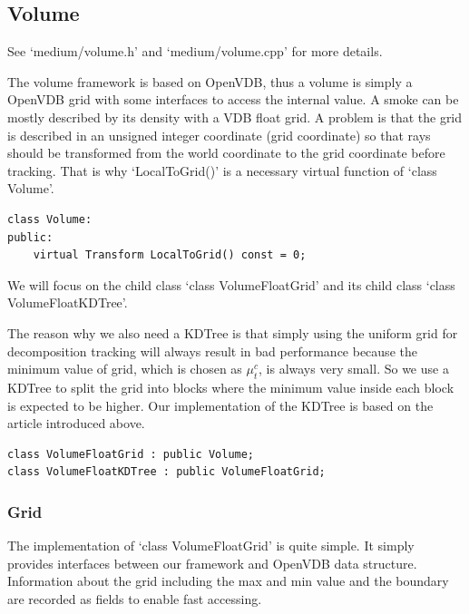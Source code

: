 \documentclass[acmtog]{acmart}
\begin{document}
\subsection{Volume}
    See `medium/volume.h' and `medium/volume.cpp' for more details.\par
        The volume framework is based on OpenVDB, 
    thus a volume is simply a OpenVDB grid with some interfaces to access the internal value.
    A smoke can be mostly described by its density with a VDB float grid.
    A problem is that the grid is described in an unsigned integer coordinate (grid coordinate) so that
    rays should be transformed from the world coordinate to the grid coordinate before tracking.
    That is why `LocalToGrid()' is a necessary virtual function of `class Volume'.
\begin{lstlisting}
class Volume:
public:
    virtual Transform LocalToGrid() const = 0;
\end{lstlisting}
    We will focus on the child class `class VolumeFloatGrid' and its child class `class VolumeFloatKDTree'.\par
        The reason why we also need a KDTree is that 
    simply using the uniform grid for decomposition tracking will always result in bad performance 
    because the minimum value of grid, which is chosen as $\mu_t^c$, is always very small.
    So we use a KDTree to split the grid into blocks where the minimum value inside each block is expected to be higher.
    Our implementation of the KDTree is based on the article introduced above.
\begin{lstlisting}
class VolumeFloatGrid : public Volume;
class VolumeFloatKDTree : public VolumeFloatGrid;
\end{lstlisting}

\subsubsection{Grid}
        The implementation of `class VolumeFloatGrid' is quite simple.
    It simply provides interfaces between our framework and OpenVDB data structure.
    Information about the grid including the max and min value and the boundary are recorded as fields to enable fast accessing.
\end{document}
